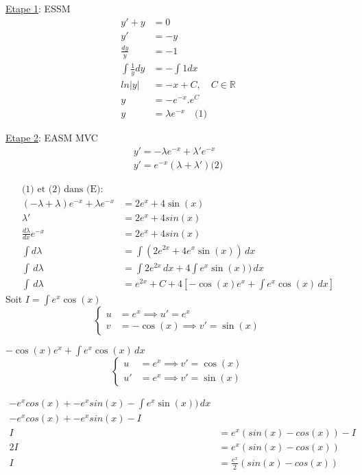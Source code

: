 \underline{Etape 1}: ESSM \\
\begin{align*}
	y' + y &= 0 \\
	y' &= -y \\
	\frac{dy}{y} &= -1 \\
	\int \frac{1}{y} dy &= - \int 1 dx \\
	ln \lvert y \lvert &= -x + C, \quad C \in \mathbb{R} \\
	y &= -e^{-x}.e^C \\
	y &= \lambda e^{-x} \quad \text{(1)}
\end{align*}

\underline{Etape 2}: EASM MVC \\
\begin{align*}
	y' = -\lambda e^{-x}	 + \lambda'e^{-x} \\
	y' = e^{-x} (\lambda + \lambda') \text{(2)}
\end{align*}

\begin{align*}
	\text{(1) et (2) dans (E):} \\
	(-\lambda + \lambda)e^{-x} + \lambda e^{-x} &= 2e^x + 4\sin(x) \\
	\lambda' &= 2e^x + 4sin(x) \\
    \frac{d\lambda}{dx}e^{-x} &= 2e^x + 4sin(x) \\
    \int d\lambda &= \int (2e^{2x} + 4e^x \sin(x)) \, dx \\
    \int \, d\lambda &= \int 2e^{2x} \, dx + 4\int e^x \sin(x)) \, dx \\
    \int \, d\lambda &= e^{2x} + C + 4 [-\cos(x)e^x + \int e^x\cos(x)\, dx]
\end{align*}
Soit $I = \int e^x\cos(x)\ $ \\
\[
\left\{
\begin{aligned}
    u &= e^x \implies u'= e^x  \\
    v &= -\cos(x) \implies v' = \sin(x)
\end{aligned}
\right.
\]

$-\cos(x)e^x + \int e^x\cos(x)\, dx$
\[
\left\{
\begin{aligned}
    u &= e^x \implies v'= \cos(x)  \\
    u' &= e^x \implies v' = \sin(x)
\end{aligned}
\right.
\]

\begin{align*}
    -e^xcos(x) + -e^xsin(x) - \int e^x \sin(x)) \, dx \\
    -e^xcos(x) + -e^xsin(x) - I \\
    I &= e^x(sin(x) - cos(x)) - I \\
    2I &= e^x(sin(x) - cos(x)) \\
    I &= \frac{e^x}{2}(sin(x) - cos(x)) 
\end{align*}

